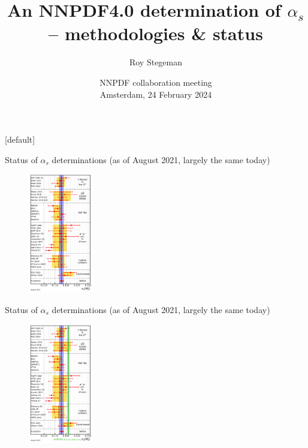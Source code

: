\documentclass[aspectratio=169, 8pt,t]{beamer}
\title{An NNPDF4.0 determination of $\alpha_s$ -- methodologies \& status}
\date{NNPDF collaboration meeting  \\[0.1cm] Amsterdam, 24 February 2024}
\author{Roy Stegeman}
\institute{\small The University of Edinburgh}
\begin{document}
{
\begin{frame}
  \titlepage
\end{frame}
}

[default]




\begin{frame}{Status of $\alpha_s$ determinations (as of August 2021, largely the same today)}
    \vspace*{-1em}
    \begin{figure}
      \includegraphics[width=0.25\textwidth]{pdg_alphas.png}
    \end{figure}
\end{frame}

\begin{frame}{Status of $\alpha_s$ determinations (as of August 2021, largely the same today)}
  \vspace*{-1em}
  \begin{figure}
    \includegraphics[width=0.25\textwidth]{pdf_alphas_updated.png}
  \end{figure}
\end{frame}
\end{document}

